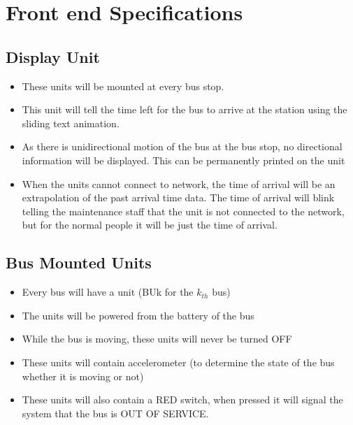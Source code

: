 \section{Front end Specifications}
\subsection{Display Unit}
\begin{itemize}
    \item These units will be mounted at every bus stop.
    \item This unit will tell the time left for the bus to arrive at the station using the sliding text animation.
    \item As there is unidirectional motion of the bus at the bus stop, no directional information will be displayed. This can be permanently printed on the unit
    \item When the units cannot connect to network, the time of arrival will be an extrapolation of the past arrival time data. The time of arrival will blink telling the maintenance staff that the unit is not connected to the network, but for the normal people it will be just the time of arrival.
\end{itemize}
\subsection{Bus Mounted Units}
\begin{itemize}
    \item Every bus will have a unit (BUk for the $k_{th}$ bus)
    \item The units will be powered from the battery of the bus 
    \item While the bus is moving, these units will never be turned OFF
    \item These units will contain accelerometer (to determine the state of the bus whether it is moving or not)
    \item These units will also contain a RED switch, when pressed it will signal the system that the bus is OUT OF SERVICE.
\end{itemize}
